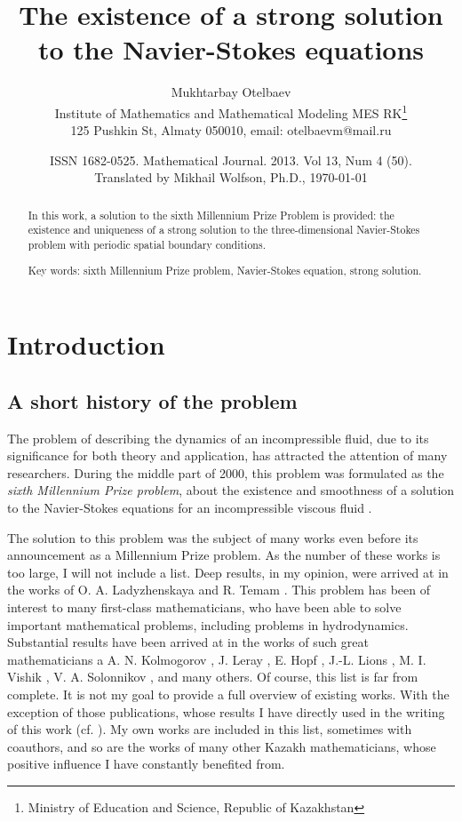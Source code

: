 \documentclass{article}
\title{The existence of a strong solution to the Navier-Stokes equations}
\author{Mukhtarbay Otelbaev\\
Institute of Mathematics and Mathematical Modeling MES
RK\thanks{Ministry of Education and Science, Republic of Kazakhstan}\\
125 Pushkin St, Almaty 050010, email: otelbaevm@mail.ru}
\date{ISSN 1682-0525. Mathematical Journal. 2013. Vol 13, Num 4 (50).\\
Translated by Mikhail Wolfson, Ph.D., \today}
\numberwithin{equation}{section}
\begin{document}
\maketitle

\begin{abstract}
    In this work, a solution to the sixth Millennium Prize Problem is provided:
    the existence and uniqueness of a strong solution to the three-dimensional
    Navier-Stokes problem with periodic spatial boundary conditions.

    Key words: sixth Millennium Prize problem, Navier-Stokes equation, strong
    solution.
\end{abstract}

\section{Introduction}

\subsection{A short history of the problem}

The problem of describing the dynamics of an incompressible fluid, due to its
significance for both theory and application, has attracted the attention of
many researchers. During the middle part of 2000, this problem was formulated
as the \emph{sixth Millennium Prize problem}, about the existence and
smoothness of a solution to the Navier-Stokes equations for an incompressible
viscous fluid \cite{clay}.

The solution to this problem was the subject of many works even before its
announcement as a Millennium Prize problem. As the number of these works is
too large, I will not include a list. Deep results, in my opinion, were
arrived at in the works of O. A. Ladyzhenskaya \cite{lad1,lad2,lad3,lad4} and R.
Temam \cite{tem1, tem2}. This problem has been of interest to many first-class
mathematicians, who have been able to solve important mathematical problems,
including problems in hydrodynamics. Substantial results have been arrived at
in the works of such great mathematicians a A. N. Kolmogorov \cite{kol1}, 
J. Leray \cite{ler1, ler2}, E. Hopf \cite{hop1}, J.-L. Lions \cite{lio1,
lio2}, M. I. Vishik \cite{vis1}, V. A. Solonnikov \cite{sol1}, and many
others. Of course, this list is far from complete. It is not my goal to provide
a full overview of existing works. With the exception of those publications,
whose results I have directly used in the writing of this work (cf.
\cite{ote1,ote2,ote3,ote4,ote5,ote6,ote7,ote8,ote9,ote10,ote11,ote12,ote13,ote14,ote15,ote16,ote17,ote18,ote19,ote20,ote21,ote22,sol2,aky1,jak1,aby1,aby2,aby3,aby4,aby5,ait1}).
My own works are included in this list, sometimes with coauthors, and so are
the works of many other Kazakh mathematicians, whose positive influence I have
constantly benefited from.
\end{document}
